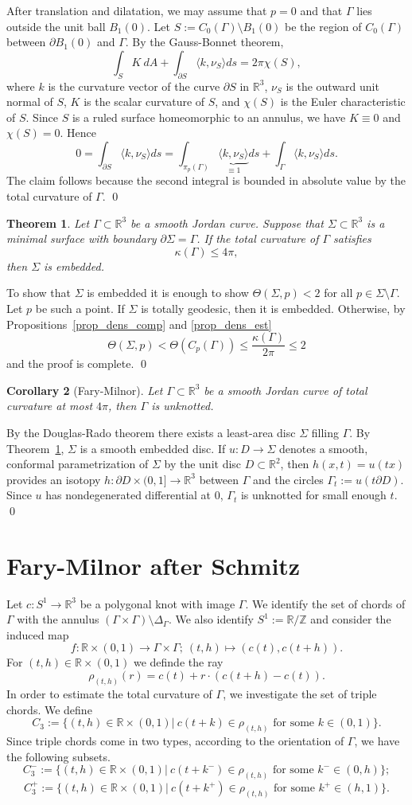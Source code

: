 \documentclass[a4paper,12pt]{amsart}
\numberwithin{equation}{section}
\def\D{\partial}
\def\R{\mathbb R}
\def\Z{\mathbb Z}
\def\ka{\kappa}
\def\Ga{\Gamma}
\def\Si{\Sigma}
\def\<{\langle}
\def\>{\rangle}
\theoremstyle{plain}
\newtheorem{thm}{Theorem}[section]
\newtheorem{cor}[thm]{Corollary}
\theoremstyle{named}
\theoremstyle{definition}
\theoremstyle{remark}
\newcommand{\bcor}{\begin{cor}}
\newcommand{\ecor}{\end{cor}}
\newcommand{\bthm}{\begin{thm}}
\newcommand{\ethm}{\end{thm}}
\begin{document}
\proof
After translation and dilatation, we may assume that $p=0$ and that $\Ga$ lies outside the unit ball $B_1(0)$.
Let $S:=C_0(\Ga)\setminus B_1(0)$ be the region of $C_0(\Ga)$ between $\D B_1(0)$ and $\Ga$. By the Gauss-Bonnet theorem,
\[\int_S K\ dA+\int_{\D S}\<k,\nu_S\> ds=2\pi\chi(S), \]
where $k$ is the curvature vector of the curve $\D S$ in $\R^3$, $\nu_S$ is the outward unit normal
of $S$, $K$ is the scalar curvature of $S$, and $\chi(S)$ is the Euler characteristic of $S$.
Since $S$ is a ruled surface homeomorphic to an annulus, we have $K\equiv 0$ and $\chi(S)=0$. Hence
\[0=\int_{\D S}\<k,\nu_S\> ds=\int_{\pi_p(\Ga)}\underbrace{\<k,\nu_S\>}_{\equiv 1} ds+\int_{\Ga}\<k,\nu_S\> ds.\]
The claim follows because the second integral is bounded in absolute value by the total curvature of $\Ga$.
\qed


\bthm\label{thm_embed}
Let $\Ga\subset\R^3$ be a smooth Jordan curve.
Suppose that $\Si\subset\R^3$ is a minimal surface with boundary $\D\Si=\Ga$.
If the total curvature of $\Ga$ satisfies
\[\ka(\Ga)\leq 4\pi,\]
then $\Si$ is embedded. 
\ethm

\proof
To show that $\Si$ is embedded it is enough to show $\Theta(\Si,p)<2$ for all $p\in\Si\setminus\Ga$.
Let $p$ be such a point.
If $\Si$ is totally geodesic, then it is embedded.
Otherwise, by Propositions~\ref{prop_dens_comp} and \ref{prop_dens_est}
\[\Theta(\Si,p)<\Theta(C_p(\Ga))\leq\frac{\ka(\Ga)}{2\pi}\leq 2\]
and the proof is complete.
\qed

\bcor[Fary-Milnor]
Let $\Ga\subset\R^3$ be a smooth Jordan curve of total curvature at most $4\pi$, then $\Ga$ is unknotted.
\ecor

\proof
By the Douglas-Rado theorem there exists a least-area disc $\Si$ filling $\Ga$.
By Theorem~\ref{thm_embed}, $\Si$ is a
smooth embedded disc. If $u:D\to\Si$ denotes a smooth, conformal parametrization of $\Si$ by the
unit disc $D\subset\R^2$, then $h(x,t)=u(tx)$ provides an isotopy $h:\D D\times(0,1]\to\R^3$ between $\Ga$
and the circles $\Ga_t:=u(t\D D)$. Since $u$ has nondegenerated differential at $0$, $\Ga_t$ is unknotted for small enough $t$.
\qed



\section{Fary-Milnor after Schmitz}

Let $c:S^1\to\R^3$ be a polygonal knot with image $\Ga$.
We identify the set of chords of $\Ga$ with the annulus $(\Ga\times\Ga)\setminus\Delta_\Ga$.
We also identify $S^1:=\R/\Z$ and consider the induced map
\[f:\R\times(0,1)\to\Ga\times\Ga;\ (t,h)\mapsto(c(t),c(t+h)).\]
For $(t,h)\in\R\times(0,1)$ we definde the ray 
\[\rho_{(t,h)}(r)=c(t)+r\cdot(c(t+h)-c(t)).\]
In order to estimate the total curvature of $\Ga$, we investigate the set of triple chords. We define 
\[
C_3:=\{(t,h)\in\R\times(0,1)|\ c(t+k)\in\rho_{(t,h)} \text{ for some } k\in(0,1)\}.
\]
Since triple chords come in two types, according to the orientation of $\Ga$, we have the following subsets.
\[
C^-_3:=\{(t,h)\in\R\times(0,1)|\ c(t+k^-)\in\rho_{(t,h)} \text{ for some } k^-\in(0,h)\};
\]
\[
C^+_3:=\{(t,h)\in\R\times(0,1)|\ c(t+k^+)\in\rho_{(t,h)} \text{ for some } k^+\in(h,1)\}.
\]
 
\end{document}
